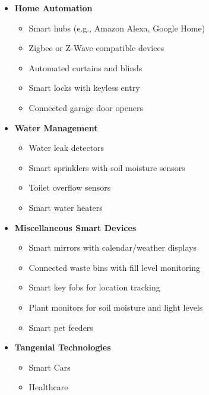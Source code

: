 \documentclass[10pt, journal]{IEEEtran} %
\begin{document}
\begin{itemize}[]
    \item{\textbf{Home Automation}}
        \begin{itemize}
            \item Smart hubs (e.g., Amazon Alexa, Google Home)
            \item Zigbee or Z-Wave compatible devices
            \item Automated curtains and blinds
            \item Smart locks with keyless entry
            \item Connected garage door openers
        \end{itemize}

    \item{\textbf{Water Management}}
        \begin{itemize}
            \item Water leak detectors
            \item Smart sprinklers with soil moisture sensors
            \item Toilet overflow sensors
            \item Smart water heaters
        \end{itemize}

    \item{\textbf{Miscellaneous Smart Devices}}
        \begin{itemize}
            \item Smart mirrors with calendar/weather displays
            \item Connected waste bins with fill level monitoring
            \item Smart key fobs for location tracking
            \item Plant monitors for soil moisture and light levels
            \item Smart pet feeders
        \end{itemize}

    \item{\textbf{Tangenial Technologies}}
        \begin{itemize}
            \item Smart Cars
            \item Healthcare
        \end{itemize}

\end{itemize}



\end{document}
